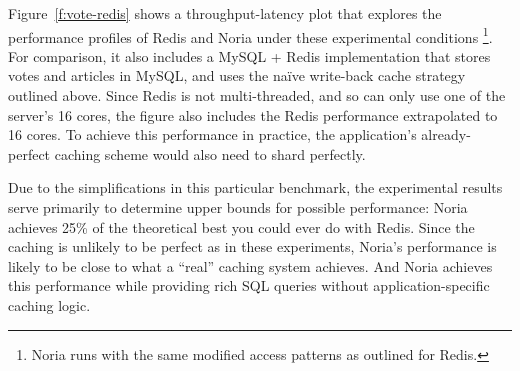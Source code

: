 Figure~\ref{f:vote-redis} shows a throughput-latency plot that explores the
performance profiles of Redis and Noria under these experimental conditions%
\footnote{Noria runs with the same modified access patterns as outlined for
Redis.}. For comparison, it also includes a MySQL + Redis implementation that
stores votes and articles in MySQL, and uses the na\"ive write-back cache
strategy outlined above. Since Redis is not multi-threaded, and so can only use
one of the server's 16 cores, the figure also includes the Redis performance
extrapolated to 16 cores. To achieve this performance in practice, the
application's already-perfect caching scheme would also need to shard perfectly.

Due to the simplifications in this particular benchmark, the experimental
results serve primarily to determine upper bounds for possible performance:
Noria achieves 25\% of the theoretical best you could ever do with Redis. Since
the caching is unlikely to be perfect as in these experiments, Noria's
performance is likely to be close to what a ``real'' caching system achieves.
And Noria achieves this performance while providing rich SQL queries without
application-specific caching logic.
